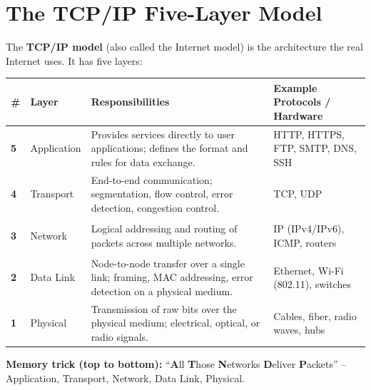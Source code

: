\documentclass[11pt, letterpaper]{article}
\begin{document}
\section*{The TCP/IP Five-Layer Model}

The \textbf{TCP/IP model} (also called the Internet model) is the architecture the real Internet uses. It has five layers:

\noindent
{\renewcommand{\arraystretch}{1.6}
\begin{tabularx}{\textwidth}{>{\bfseries\centering\arraybackslash}p{1cm}
                              >{\bfseries\raggedright\arraybackslash}p{3.5cm}
                              >{\raggedright\arraybackslash}X
                              >{\raggedright\arraybackslash}p{3.8cm}}
\toprule
\rowcolor{tableheader}
\textbf{\#} & \textbf{Layer} & \textbf{Responsibilities} & \textbf{Example Protocols / Hardware} \\
\midrule
\rowcolor{rowB} 5 & Application     & Provides services directly to user applications; defines the format and rules for data exchange. & HTTP, HTTPS, FTP, SMTP, DNS, SSH \\
\rowcolor{rowA} 4 & Transport       & End-to-end communication; segmentation, flow control, error detection, congestion control. & TCP, UDP \\
\rowcolor{rowB} 3 & Network         & Logical addressing and routing of packets across multiple networks. & IP (IPv4/IPv6), ICMP, routers \\
\rowcolor{rowA} 2 & Data Link       & Node-to-node transfer over a single link; framing, MAC addressing, error detection on a physical medium. & Ethernet, Wi-Fi (802.11), switches \\
\rowcolor{rowB} 1 & Physical        & Transmission of raw bits over the physical medium; electrical, optical, or radio signals. & Cables, fiber, radio waves, hubs \\
\bottomrule
\end{tabularx}}

\vspace{4pt}
\begin{tcolorbox}[colback=partbg, colframe=sectionblue, arc=3pt, boxrule=1pt]
\textbf{Memory trick (top to bottom):} ``\textbf{A}ll \textbf{T}hose \textbf{N}etworks \textbf{D}eliver \textbf{P}ackets'' -- Application, Transport, Network, Data Link, Physical.
\end{tcolorbox}

\end{document}
